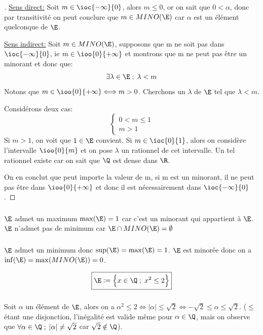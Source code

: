 \begin{proof}[\unskip\nopunct]
   \underline{Sens direct:}\+
   Soit \(m \in \ioc{-\infty}{0}\), alors \(m \leq 0\), or on sait que \(0 < \alpha\), donc par transitivité on peut conclure que \(m \in MINO(\E)\) car \(\alpha\) est un élément quelconque de \(\E\).\<

   \underline{Sens indirect:}\+
   Soit \(m \in MINO(\E)\), supposons que m ne soit pas dans \(\ioc{-\infty}{0}\), ie \(m \in \ioo{0}{+\infty}\) et montrons que m ne peut pas être un minorant et donc que:
   \[
      \exists \lambda \in \E \; ; \; \lambda < m   
   \]
   Notons que \(m \in \ioo{0}{+\infty} \Longleftrightarrow m > 0\). Cherchons un \(\lambda\) de \(\E\) tel que \(\lambda < m\).\<

   Considérons deux cas:
   \[
      \begin{cases}
         0 < m \leq 1 \\
         m > 1
      \end{cases}
   \]
   Si \(m > 1\), on voit que \(1 \in \E\) convient.\+
   Si \(m \in \ioc{0}{1}\), alors on considère l'intervalle \(\ioo{0}{m}\) et on pose \(\lambda\) un rationnel de cet intervalle. Un tel rationnel existe car on sait que \(\Q\) est dense dans \(\R\).

   On en conclut que peut importe la valeur de m, si m est un minorant, il ne peut pas être dans \(\ioo{0}{+\infty}\) et donc il est nécessairement dans \(\ioc{-\infty}{0}\).
\end{proof}

\subsubsection*{}
\(\E\) admet un maximum \(\max(\E) = 1\) car c'est un minorant qui appartient à \(\E\).\+
\(\E\) n'admet pas de minimum car \(\E \cap MINO(\E) = \emptyset\)

\subsubsection*{}
\(\E\) admet un minimum donc \(\sup(\E) = \max(\E) = 1\).\+
\(\E\) est minorée donc on a \(\inf(\E) = \max(MINO(\E)) = 0\).\+

\pagebreak


\[ 
   \boxed{\E:= \Bigl\{ x \in \Q\; ; \; x^2 \leq 2 \Bigl\}}
\]

\subsubsection*{}
Soit $\alpha$ un élément de $\E$, alors on a $\alpha^2 \leq 2 \Longleftrightarrow |\alpha| \leq \sqrt{2} \Longleftrightarrow -\sqrt{2} \leq \alpha \leq \sqrt{2}$.
($\leq$ étant une disjonction, l'inégalité est valide même pour $\alpha \in \Q$, mais on observe que $\forall \alpha \in \Q \; ; \;|\alpha| \neq \sqrt{2}$ car $\sqrt{2} \notin \Q$).\<

